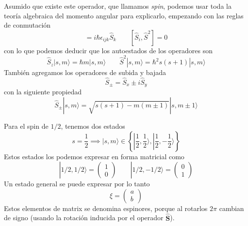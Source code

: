 \documentclass{book}
\numberwithin{equation}{section} %
\begin{document}
Asumido que existe este operador, que llamamos \emph{spin}, podemos usar toda la teoría algebraica del momento angular para explicarlo, empezando con las reglas de conmutación
\begin{equation}
        [\hat{S}_i, \hat{S}_j] = i \hbar \epsilon_{ijk} \hat{S}_k \qquad [\hat{S}_i, \hat{S}^2] = 0
\end{equation}
con lo que podemos deducir que los autoestados de los operadores  son
\begin{equation}
\hat{S}_z |s,m\rangle = \hbar m |s,m\rangle \qquad \hat{S}^2 |s, m\rangle = \hbar^2 s(s + 1) |s,m\rangle
\end{equation}
También agregamos los operadores de subida y bajada
\begin{equation}
 \hat{S}_\pm = \hat{S}_x \pm i \hat{S}_y
\end{equation}
con la siguiente propiedad
\begin{equation}
\hat{S}_\pm |s, m\rangle = \sqrt{s(s+1) - m( m \pm 1)} |s, m \pm 1 \rangle 
\end{equation}

Para el spin de $1/2$, tenemos dos estados
\begin{equation}
    s = \frac{1}{2} \implies |s,m\rangle \in \left\{\left|\frac{1}{2},\frac{1}{2}\right.\rangle, \left|\frac{1}{2},-\frac{1}{2}\right.\rangle\right\}
\end{equation}
Estos estados los podemos expresar en forma matricial como
\begin{equation}
|1/2,1/2\rangle = \begin{pmatrix} 1 \\ 0 \end{pmatrix} \qquad |1/2,-1/2\rangle = \begin{pmatrix} 0 \\ 1 \end{pmatrix}
\end{equation}
Un estado general se puede expresar por lo tanto
\begin{equation}
    \xi = \begin{pmatrix} a \\ b \end{pmatrix}
\end{equation}
Estos elementos de matrix se denomina espinores, porque al rotarlos $2\pi$ cambian de signo (usando la rotación inducida por el operador $\hat{\boldsymbol{S}}$).
\end{document}
